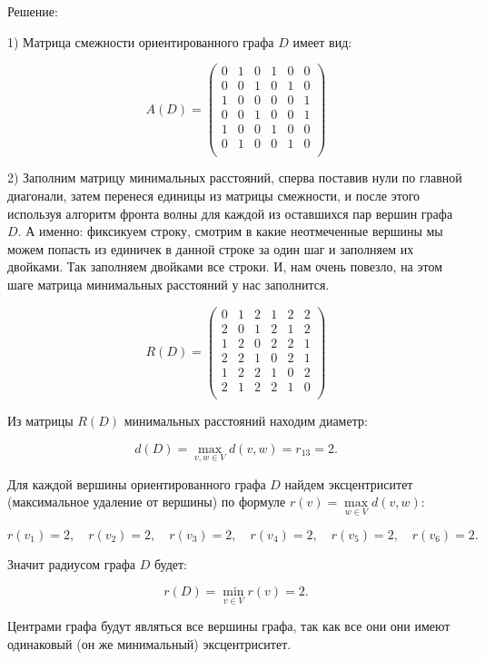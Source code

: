 \documentclass[fleqn]{article}
\begin{document}
\begin{center}Решение:\end{center}

1) Матрица смежности ориентированного графа $D$ имеет вид:

$$A(D)=
\begin{pmatrix}
0 & 1 & 0 & 1 & 0 & 0 \\
0 & 0 & 1 & 0 & 1 & 0 \\
1 & 0 & 0 & 0 & 0 & 1 \\
0 & 0 & 1 & 0 & 0 & 1 \\
1 & 0 & 0 & 1 & 0 & 0 \\
0 & 1 & 0 & 0 & 1 & 0 \\
\end{pmatrix}
$$

2) Заполним матрицу минимальных расстояний, сперва поставив нули по главной диагонали, затем перенеся единицы из матрицы смежности, и после этого используя алгоритм фронта волны для каждой из оставшихся пар вершин графа $D$. А именно: фиксикуем строку, смотрим в какие неотмеченные вершины мы можем попасть из единичек в данной строке за один шаг и заполняем их двойками. Так заполняем двойками все строки. И, нам очень повезло, на этом шаге матрица минимальных расстояний у нас заполнится.

$$R(D)=
\begin{pmatrix}
0 & 1 & 2 & 1 & 2 & 2 \\
2 & 0 & 1 & 2 & 1 & 2 \\
1 & 2 & 0 & 2 & 2 & 1 \\
2 & 2 & 1 & 0 & 2 & 1 \\
1 & 2 & 2 & 1 & 0 & 2 \\
2 & 1 & 2 & 2 & 1 & 0 \\
\end{pmatrix}
$$

Из матрицы $R(D)$ минимальных расстояний находим диаметр:

$$d(D)=\max\limits_{v,w\in V} d(v,w)=r_{13}=2.$$

Для каждой вершины ориентированного графа $D$ найдем эксцентриситет (максимальное удаление от вершины) по формуле $r(v)=\max\limits_{w\in V} d(v,w)$:

$$r(v_1)=2,\quad r(v_2)=2,\quad r(v_3)=2,\quad r(v_4)=2,\quad r(v_5)=2,\quad r(v_6)=2.$$

Значит радиусом графа $D$ будет:

$$r(D)=\min\limits_{v\in V}r(v)=2.$$

Центрами графа будут являться все вершины графа, так как все они они имеют одинаковый (он же минимальный) эксцентриситет.
\end{document}
